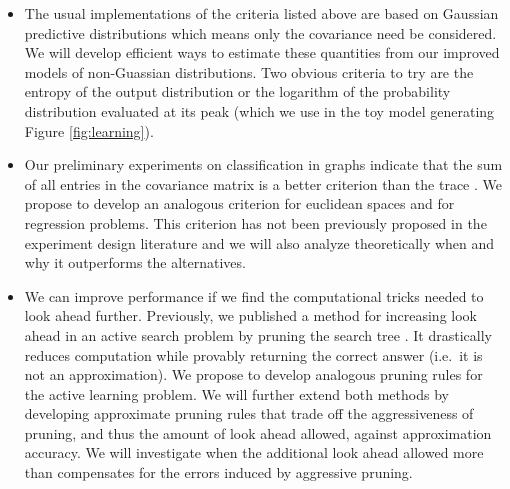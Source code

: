 \documentclass[prd,nofootbib,floatfix,11pt,tightenlines,nofootinbib]{revtex4}
\begin{document}
\vspace{.5\baselineskip}
\begin{itemize}

\item The usual implementations of the criteria listed above are based on
  Gaussian predictive distributions which means only the covariance need be
  considered.  We will develop efficient ways to estimate these quantities
  from our improved models of non-Guassian distributions.  Two obvious criteria to try
  are the entropy of the output distribution or the logarithm of the probability
  distribution evaluated at its peak (which we use in the toy model
  generating Figure \ref{fig:learning}).

\item Our preliminary experiments on classification in graphs indicate that
  the sum of all entries in the covariance matrix is a better criterion
  than the trace \cite{YifeiMa12}.  We propose to develop an analogous
  criterion for euclidean spaces and for regression problems.  This
  criterion has not been previously proposed in the experiment design
  literature and we will also analyze theoretically when and why it
  outperforms the alternatives.

\item We can improve performance if we find the computational tricks needed
  to look ahead further.  Previously, we published a method for increasing
  look ahead in an active search problem by pruning the search tree
  \cite{Garnett12}.  It drastically reduces computation while provably
  returning the correct answer (i.e.\ it is not an approximation).  We propose to
  develop analogous pruning rules for the active learning problem.  We will
  further extend both methods by developing approximate pruning rules that
  trade off the aggressiveness of pruning, and thus the amount of look
  ahead allowed, against approximation accuracy.  We will investigate when
  the additional look ahead allowed more than compensates for the errors
  induced by aggressive pruning.

\end{itemize}
\vspace{.5\baselineskip}
\end{document}

